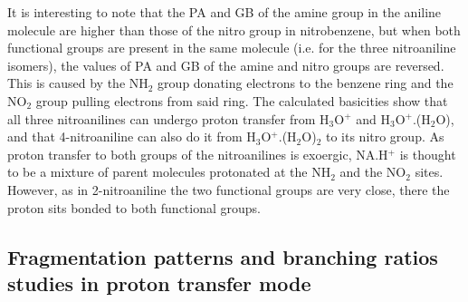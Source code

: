 It is interesting to note that the PA and GB of the amine group in the  aniline molecule are higher than those of the nitro group in nitrobenzene, but when both functional groups are present in the same molecule (i.e. for the three nitroaniline isomers), the values of PA and GB of the amine and nitro groups are reversed. %
This is caused by the NH$_2$ group donating electrons to the benzene ring and the NO$_2$ group pulling electrons from said ring. 
The calculated basicities show that all three nitroanilines can undergo proton transfer from H$_3$O$^+$ and H$_3$O$^+$.(H$_2$O), and that 4-nitroaniline can also do it from H$_3$O$^+$.(H$_2$O)$_2$ to its nitro group.
As proton transfer to both groups of the nitroanilines is exoergic, NA.H$^+$ is thought to be a mixture of parent molecules protonated at the NH$_2$ and the NO$_2$ sites. However, as in 2-nitroaniline the two functional groups are very close, there the proton sits bonded to both functional groups.





\subsection{Fragmentation patterns and branching ratios studies in proton transfer mode}

